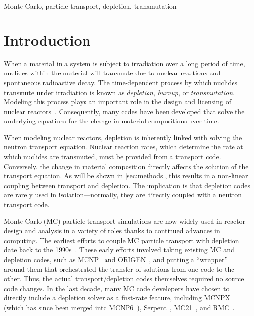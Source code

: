 \documentclass[3p,authoryear]{elsarticle}
\begin{document}
\begin{keyword}
  Monte Carlo, particle transport, depletion, transmutation
\end{keyword}

\maketitle

\section{Introduction}

When a material in a system is subject to irradiation over a long period of
time, nuclides within the material will transmute due to nuclear reactions and
spontaneous radioactive decay. The time-dependent process by which nuclides
transmute under irradiation is known as \emph{depletion}, \emph{burnup}, or
\emph{transmutation}. Modeling this process plays an important role in the
design and licensing of nuclear reactors~\citep{betzler2019ned}. Consequently,
many codes have been developed that solve the underlying equations for the
change in material compositions over time.

When modeling nuclear reactors, depletion is inherently linked with solving the
neutron transport equation. Nuclear reaction rates, which determine the rate at
which nuclides are transmuted, must be provided from a transport code.
Conversely, the change in material composition directly affects the solution of
the transport equation. As will be shown in \cref{sec:methods}, this results in
a non-linear coupling between transport and depletion. The implication is that
depletion codes are rarely used in isolation---normally, they are directly
coupled with a neutron transport code.

Monte Carlo (MC) particle transport simulations are now widely used in reactor
design and analysis in a variety of roles thanks to continued advances in
computing. The earliest efforts to couple MC particle transport with depletion
date back to the 1990s~\citep{moore1995inel,trellue1998lanl}. These early
efforts involved taking existing MC and depletion codes, such as
MCNP~\citep{goorley2012nt} and ORIGEN~\citep{croff1983nt}, and putting a
``wrapper'' around them that orchestrated the transfer of solutions from one
code to the other. Thus, the actual transport/depletion codes themselves
required no source code changes. In the last decade, many MC code developers
have chosen to directly include a depletion solver as a first-rate feature,
including MCNPX~\citep{waters2007aip} (which has since been merged into
MCNP6~\citep{goorley2012nt}), Serpent~\citep{leppanen2015ane},
MC21~\citep{griesheimer2015ane}, and RMC~\citep{wang2015ane}.
\end{document}
